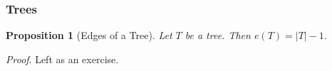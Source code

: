 \documentclass[11pt, mathserif]{beamer}
\newtheorem{proposition}{Proposition}
\theoremstyle{definition}
\theoremstyle{remark}
\begin{document}
\begin{frame}
  \frametitle{Trees}

  \begin{proposition}[Edges of a Tree]
    Let $T$ be a tree. Then $e(T) = |T| - 1$.
  \end{proposition}

  \emph{Proof}. Left as an exercise.%

\end{frame}
\end{document}
